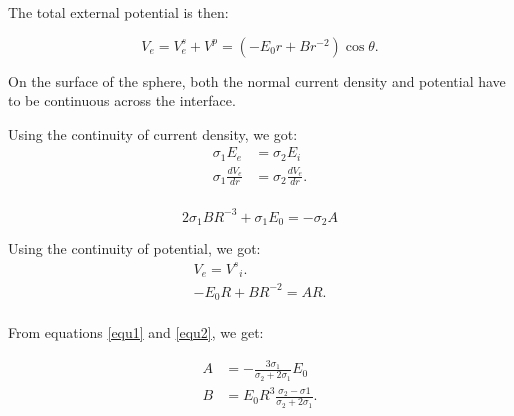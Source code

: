 \documentclass[11pt,letterpaper,leqno]{amsart}
\numberwithin{equation}{section}
\begin{document}



The total external potential is then:

\begin{equation} 
V_e= V^s_e + {V^p} = (-E_0 r + B r^{-2}) \cos \theta.
\end{equation}

On the surface of the sphere, both the normal current density and potential have to be continuous across the interface.

 \vspace{0.4cm}


Using the continuity of current density, we got:
\begin{equation}
\begin{aligned}
\sigma_1 E_e & = \sigma_2 E_i \\
\sigma_1 \frac{dV_e}{dr} & = \sigma_2 \frac{dV_e}{dr}. \\
\end{aligned}
\end{equation}

\begin{equation}\label{equ1}
2 \sigma_1 B R^{-3} + \sigma_1 E_0 = - \sigma_2 A
\end{equation}


Using the continuity of potential, we got:
\begin{equation}\label{equ2}
\begin{aligned}
{V_e}={V^s}_i.\\
-E_0 R + B R^{-2} = A R.\\
\end{aligned}
\end{equation}

From equations \ref{equ1} and \ref{equ2}, we get:

\begin{equation}
\begin{aligned}
A & =-\frac{3 \sigma_1}{\sigma_2 + 2\sigma_1} E_0 \\
B & =E_0 R^3 \frac{\sigma_2-\sigma1}{\sigma_2+2\sigma_1}. 
\end{aligned}
 \end{equation}

 \vspace{0.4cm}
\end{document}
